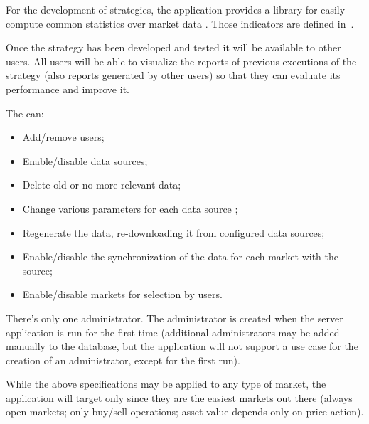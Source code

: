 For the development of strategies, the application provides a library for easily
compute common statistics over market data . Those indicators are
defined in~.

Once the strategy has been developed and tested it will be available to other
users. All users will be able to visualize the reports of previous executions of
the strategy (also reports generated by other users) so that they can evaluate
its performance and improve it.

The  can:
\begin{itemize}
	\item Add/remove users;
	\item Enable/disable data sources;
	\item Delete old or no-more-relevant data;
	\item Change various parameters for each data source ;
	\item Regenerate the data, re-downloading it from configured data
		sources;
	\item Enable/disable the synchronization of the data for each market
		with the source;
	\item Enable/disable markets for selection by users.
\end{itemize}

There's only one administrator. The administrator is created when the server
application is run for the first time (additional administrators may be added
manually to the database, but the application will not support a use case for
the creation of an administrator, except for the first run).

While the above specifications may be applied to any type of market, the
application will target only  since they are
the easiest markets out there (always open markets; only buy/sell operations;
asset value depends only on price action).
